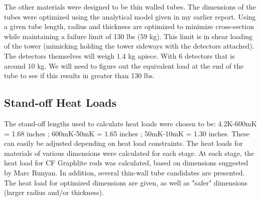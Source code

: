 \documentclass{article}
\begin{document}
The other materials were designed to be thin walled tubes. The dimensions of the tubes were optimized using the analytical model given in my earlier report. Using a given tube length, radius and thickness are optimized to minimize cross-section while maintaining a failure limit of 130 lbs (59 kg). This limit is in shear loading of the tower (mimicking holding the tower sideways with the detectors attached). The detectors themselves will weigh 1.4 kg apiece. With 6 detectors that is around 10 kg. We will need to figure out the equivalent load at the end of the tube to see if this results in greater than 130 lbs.

\subsection{Stand-off Heat Loads}

The stand-off lengths used to calculate heat loads were chosen to be: 4.2K-600mK = 1.68 inches ; 600mK-50mK = 1.65 inches ; 50mK-10mK = 1.30 inches. These can easily be adjusted depending on heat load constraints. The heat loads for materials of various dimensions were calculated for each stage. At each stage, the heat load for CF Graphlite rods was calculated, based on dimensions suggested by Marc Runyan. In addition, several thin-wall tube candidates are presented. The heat load for optimized dimensions are given, as well as "safer" dimensions (larger  radius and/or thickness).
\end{document}
